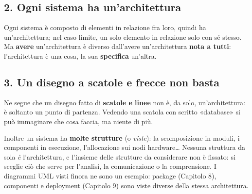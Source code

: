\subsection{2. Ogni sistema ha un'architettura}

Ogni sistema è composto di elementi in relazione fra loro, quindi ha un'architettura; nel caso limite, un solo elemento in
relazione solo con sé stesso. Ma \textbf{avere} un'architettura è diverso dall'avere un'architettura \textbf{nota a tutti}:
l'architettura è una cosa, la sua \textbf{specifica} un'altra.


\subsection{3. Un disegno a scatole e frecce non basta}

Ne segue che un disegno fatto di \textbf{scatole e linee} non è, da solo, un'architettura: è soltanto un punto di partenza.
Vedendo una scatola con scritto «database» si può immaginare che cosa faccia, ma niente di più.

\begin{center}
\end{center}

Inoltre un sistema ha \textbf{molte strutture} (o \textit{viste}): la scomposizione in moduli, i componenti in esecuzione,
l'allocazione sui nodi hardware\ldots{} Nessuna struttura da sola \textit{è} l'architettura, e l'insieme delle strutture da
considerare non è fissato: si sceglie ciò che serve per l'analisi, la comunicazione o la comprensione. I diagrammi UML visti
finora ne sono un esempio: package (Capitolo 8), componenti e deployment (Capitolo 9) sono viste diverse della stessa
architettura.

